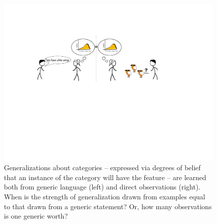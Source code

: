 \documentclass[10pt,letterpaper]{article}
\begin{document}
\begin{figure}[t]
\begin{center}
\includegraphics[width=\linewidth]{figs/cartoon-fig.pdf}
\end{center}
\caption{Generalizations about categories -- expressed via degrees of belief that an instance of the category will have the feature -- are learned both from generic language (left) and direct observations (right). When is the strength of generalization drawn from examples equal to that drawn from a generic statement? Or, how many observations is one generic worth?}
\label{fig:cartoon}
\end{figure}

\end{document}
